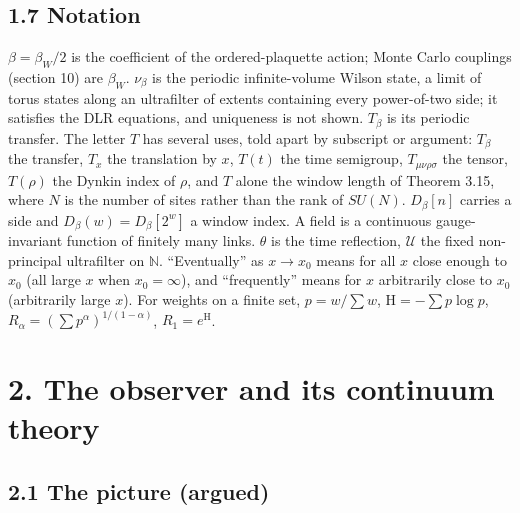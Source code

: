 \documentclass[10pt,letterpaper,twocolumn]{article}
\begin{document}
\subsection{1.7 Notation}\label{17-notation}

\(\beta=\beta_W/2\) is the coefficient of the ordered-plaquette action; Monte Carlo couplings (section 10) are \(\beta_W\). \(\nu_\beta\) is the periodic infinite-volume Wilson state, a limit of torus states along an ultrafilter of extents containing every power-of-two side; it satisfies the DLR equations, and uniqueness is not shown. \(T_\beta\) is its periodic transfer. The letter \(T\) has several uses, told apart by subscript or argument: \(T_\beta\) the transfer, \(T_x\) the translation by \(x\), \(T(t)\) the time semigroup, \(T_{\mu\nu\rho\sigma}\) the tensor, \(T(\rho)\) the Dynkin index of \(\rho\), and \(T\) alone the window length of Theorem 3.15, where \(N\) is the number of sites rather than the rank of \(SU(N)\). \(D_\beta[n]\) carries a side and \(D_\beta(w)=D_\beta[2^w]\) a window index. A field is a continuous gauge-invariant function of finitely many links. \(\theta\) is the time reflection, \(\mathcal U\) the fixed non-principal ultrafilter on \(\mathbb N\). ``Eventually'' as \(x\to x_0\) means for all \(x\) close enough to \(x_0\) (all large \(x\) when \(x_0=\infty\)), and ``frequently'' means for \(x\) arbitrarily close to \(x_0\) (arbitrarily large \(x\)). For weights on a finite set, \(p=w/\sum w\), \(\mathrm H=-\sum p\log p\), \(R_\alpha=(\sum p^\alpha)^{1/(1-\alpha)}\), \(R_1=e^{\mathrm H}\).

\section{2. The observer and its continuum theory}\label{2-the-observer-and-its-continuum-theory}

\subsection{2.1 The picture (argued)}\label{21-the-picture-argued}
\end{document}
